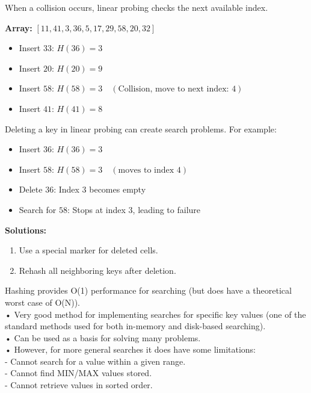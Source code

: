 \documentclass[a4paper,12pt]{article}
\begin{document}
When a collision occurs, linear probing checks the next available index.

\textbf{Array: } \([11, 41, 3, 36, 5, 17, 29, 58, 20, 32]\)

\begin{itemize}
    \item Insert \(33\): \(H(36) = 3\)
    \item Insert \(20\): \(H(20) = 9\)
    \item Insert \(58\): \(H(58) = 3 \quad (\text{Collision, move to next index: } 4)\)
    \item Insert \(41\): \(H(41) = 8\)
\end{itemize}

Deleting a key in linear probing can create search problems. For example:

\begin{itemize}
    \item Insert \(36\): \(H(36) = 3\)
    \item Insert \(58\): \(H(58) = 3 \quad (\text{moves to index 4})\)
    \item Delete \(36\): Index 3 becomes empty
    \item Search for \(58\): Stops at index 3, leading to failure
\end{itemize}

\textbf{Solutions:}
\begin{enumerate}
    \item Use a special marker for deleted cells.
    \item Rehash all neighboring keys after deletion.
\end{enumerate}

Hashing provides O(1) performance for searching (but does have a theoretical worst case of O(N)).\\
• Very good method for implementing searches for specific key values (one of the standard methods used for both in-memory and disk-based searching).\\
• Can be used as a basis for solving many problems.\\
• However, for more general searches it does have some limitations:\\
- Cannot search for a value within a given range.\\
- Cannot find MIN/MAX values stored.\\
- Cannot retrieve values in sorted order.\\

\newpage
\end{document}
